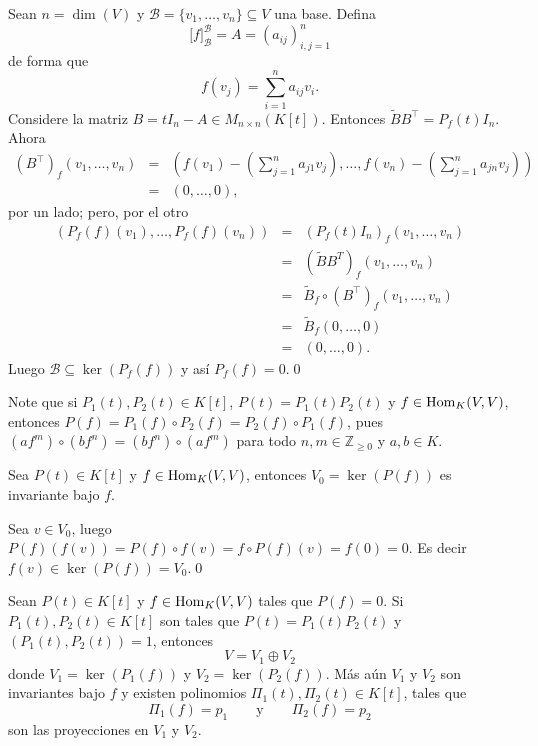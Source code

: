 \dem Sean $n=\dim(V)$ y $\mathcal{B}=\{v_1,\ldots,v_n\}\subseteq V$ una base. Defina
\[
\Big[f\Big]^{\mathcal{B}}_\mathcal{B}=A=(a_{ij})_{i,j=1}^n
\]
de forma que
\[
f(v_j)=\sum_{i=1}^na_{ij}v_i.
\]
Considere la matriz $B=tI_n-A\in M_{n\times n}(K[t])$. Entonces $\tilde{B}B^\intercal=P_f(t)I_n$. Ahora
\begin{eqnarray*}
\left(B^\intercal\right)_f(v_1,\ldots, v_n)& = & \left(f(v_1)-\left(\sum_{j=1}^na_{j1}v_j\right),\ldots, f(v_n)-\left(\sum_{j=1}^na_{jn}v_j\right)\right)\\
   & = & \left(0,\ldots, 0\right),
\end{eqnarray*}
por un lado; pero, por el otro
\begin{eqnarray*}
\left(P_f(f)(v_1),\ldots, P_f(f)(v_n)\right) & = & \left(P_f(t)I_n\right)_f(v_1,\ldots,v_n)\\
    & = & \left( \tilde{B}B^T \right)_f (v_1,\ldots, v_n)\\
    & = & \tilde{B}_f\circ\left(B^\intercal\right)_f(v_1,\ldots,v_n)\\
    & = & \tilde{B}_f(0,\ldots, 0)\\
    & = & (0,\ldots, 0).
\end{eqnarray*}
Luego $\mathcal{B}\subseteq \ker\left(P_f(f)\right)$ y as\'i $P_f(f)=0$.\qed

\begin{obs}\label{polyconmutan}
Note que si $P_1(t),P_2(t)\in K[t]$, $P(t)=P_1(t)P_2(t)$ y $f\in\operatorname{Hom}_K(V,V)$, entonces $P(f)=P_1(f)\circ P_2(f)=P_2(f)\circ P_1(f)$, pues $\left(af^m\right)\circ\left( bf^n\right)=\left( bf^n\right)\circ \left(af^m\right)$ para todo $n,m\in\mathbb{Z}_{\ge 0}$ y $a,b\in K$.
\end{obs}

\begin{pro}
Sea $P(t)\in K[t]$ y $f\in\operatorname{Hom}_K(V,V)$, entonces $V_0=\ker\left(P(f)\right)$ es invariante bajo $f$.
\end{pro}

\dem Sea $v\in V_0$, luego $P(f)\left(f(v)\right)=P(f)\circ f(v)=f\circ P(f)(v)=f(0)=0$. Es decir $f(v)\in\ker\left(P(f)\right)=V_0$.\qed

\begin{pro}
Sean $P(t)\in K[t]$ y $f\in\operatorname{Hom}_K(V,V)$ tales que $P(f)=0$. Si $P_1(t),P_2(t)\in K[t]$ son tales que $P(t)=P_1(t)P_2(t)$ y $\left(P_1(t),P_2(t)\right)=1$, entonces
\[
V=V_1\oplus V_2
\] 
donde $V_1=\ker\left(P_1(f)\right)$ y $V_2=\ker\left(P_2(f)\right)$. M\'as a\'un $V_1$ y $V_2$ son invariantes bajo $f$ y existen polinomios $\Pi_1(t),\Pi_2(t)\in K[t]$, tales que
\[
\Pi_1(f)=p_1\qquad\textrm{y}\qquad\Pi_2(f)=p_2
\]
son las proyecciones en $V_1$ y $V_2$.
\end{pro}

